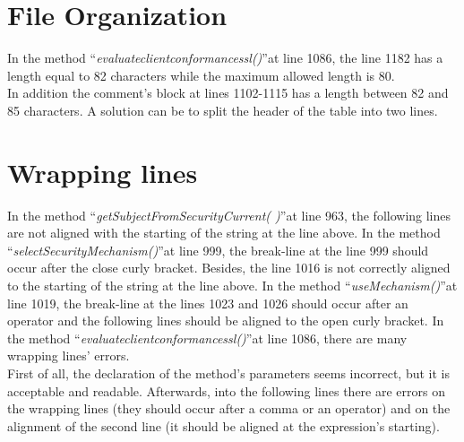 \documentclass[\mainpath/main]{subfiles}
\begin{document}
\section{File Organization}
\label{CodeInspectionChecklist:FileOrganization}
In the method \textquotedblleft \textit{evaluate\textunderscore client\textunderscore conformance\textunderscore ssl(\textellipsis)}\textquotedblright at line 1086, the line 1182 has a length equal to 82 characters while the maximum allowed length is 80.\\
In addition the comment's block at lines 1102-1115 has a length between 82 and 85 characters. A solution can be to split the header of the table into two lines.

\section{Wrapping lines}
\label{CodeInspectionChecklist:WrappingLines}
In the method \textquotedblleft \textit{getSubjectFromSecurityCurrent( )}\textquotedblright at line 963, the following lines are not aligned with the starting of the string at the line above.
In the method \textquotedblleft \textit{selectSecurityMechanism(\textellipsis)}\textquotedblright at line 999, the break-line at the line 999 should occur after the close curly bracket.
Besides, the line 1016 is not correctly aligned to the starting of the string at the line above.
In the method \textquotedblleft \textit{useMechanism(\textellipsis)}\textquotedblright at line 1019, the break-line at the lines 1023 and 1026 should occur after an operator and the following lines should be aligned to the open curly bracket.
In the method \textquotedblleft \textit{evaluate\textunderscore client\textunderscore conformance\textunderscore ssl(\textellipsis)}\textquotedblright at line 1086, there are many wrapping lines' errors.\\
First of all, the declaration of the method's parameters seems incorrect, but it is acceptable and readable. Afterwards, into the following lines there are errors on the wrapping lines (they should occur after a comma or an operator) and on the alignment of the second line (it should be aligned at the expression's starting).
\end{document}
